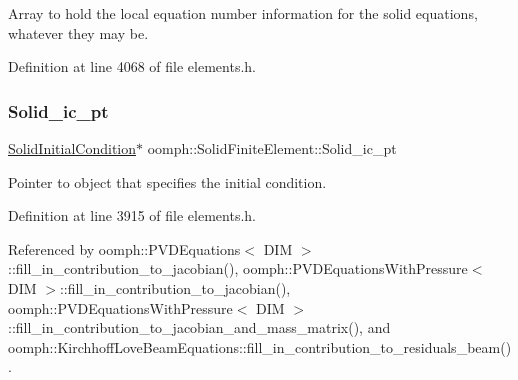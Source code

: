 Array to hold the local equation number information for the solid equations, whatever they may be. 



Definition at line 4068 of file elements.\+h.

\mbox{\label{classoomph_1_1SolidFiniteElement_a65f789b537979bc3e1948ce529f1dabe}} 
\subsubsection{\texorpdfstring{Solid\+\_\+ic\+\_\+pt}{Solid\_ic\_pt}}
{\footnotesize\ttfamily \hyperlink{classoomph_1_1SolidInitialCondition}{Solid\+Initial\+Condition}$\ast$ oomph\+::\+Solid\+Finite\+Element\+::\+Solid\+\_\+ic\+\_\+pt\hspace{0.3cm}{\ttfamily [protected]}}



Pointer to object that specifies the initial condition. 



Definition at line 3915 of file elements.\+h.



Referenced by oomph\+::\+P\+V\+D\+Equations$<$ D\+I\+M $>$\+::fill\+\_\+in\+\_\+contribution\+\_\+to\+\_\+jacobian(), oomph\+::\+P\+V\+D\+Equations\+With\+Pressure$<$ D\+I\+M $>$\+::fill\+\_\+in\+\_\+contribution\+\_\+to\+\_\+jacobian(), oomph\+::\+P\+V\+D\+Equations\+With\+Pressure$<$ D\+I\+M $>$\+::fill\+\_\+in\+\_\+contribution\+\_\+to\+\_\+jacobian\+\_\+and\+\_\+mass\+\_\+matrix(), and oomph\+::\+Kirchhoff\+Love\+Beam\+Equations\+::fill\+\_\+in\+\_\+contribution\+\_\+to\+\_\+residuals\+\_\+beam().

\mbox{\label{classoomph_1_1SolidFiniteElement_a52ba6cbb89b5edfe7592a49171aeb436}} 
